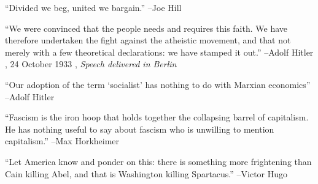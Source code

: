 \documentclass{article}%
\begin{document}
\linebreak%
\vspace{1mm}%
\begin{minipage}{\textwidth}%
\flushleft%
“Divided we beg, united we bargain.”%
\linebreak%
\vspace{1mm}%
–Joe Hill%
\linebreak%
\vspace{1mm}%
\end{minipage}%
\linebreak%
\vspace{1mm}%
\begin{minipage}{\textwidth}%
\flushleft%
“We were convinced that the people needs and requires this faith. We have therefore undertaken the fight against the atheistic movement, and that not merely with a few theoretical declarations: we have stamped it out.”%
\linebreak%
\vspace{1mm}%
–Adolf Hitler%
, 24 October 1933%
, \textit{Speech delivered in Berlin}%
\linebreak%
\vspace{1mm}%
\end{minipage}%
\linebreak%
\vspace{1mm}%
\begin{minipage}{\textwidth}%
\flushleft%
“Our adoption of the term ‘socialist’ has nothing to do with Marxian economics”%
\linebreak%
\vspace{1mm}%
–Adolf Hitler%
\linebreak%
\vspace{1mm}%
\end{minipage}%
\linebreak%
\vspace{1mm}%
\begin{minipage}{\textwidth}%
\flushleft%
“Fascism is the iron hoop that holds together the collapsing barrel of capitalism. He has nothing useful to say about fascism who is unwilling to mention capitalism.”%
\linebreak%
\vspace{1mm}%
–Max Horkheimer%
\linebreak%
\vspace{1mm}%
\end{minipage}%
\linebreak%
\vspace{1mm}%
\begin{minipage}{\textwidth}%
\flushleft%
“Let America know and ponder on this: there is something more frightening than Cain killing Abel, and that is Washington killing Spartacus.”%
\linebreak%
\vspace{1mm}%
–Victor Hugo%
\linebreak%
\vspace{1mm}%
\end{minipage}%
\end{document}
